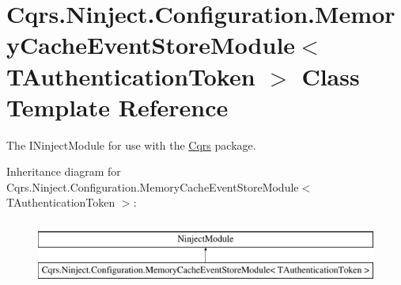 \hypertarget{classCqrs_1_1Ninject_1_1Configuration_1_1MemoryCacheEventStoreModule}{}\section{Cqrs.\+Ninject.\+Configuration.\+Memory\+Cache\+Event\+Store\+Module$<$ T\+Authentication\+Token $>$ Class Template Reference}
\label{classCqrs_1_1Ninject_1_1Configuration_1_1MemoryCacheEventStoreModule}


The I\+Ninject\+Module for use with the \hyperlink{namespaceCqrs}{Cqrs} package.  


Inheritance diagram for Cqrs.\+Ninject.\+Configuration.\+Memory\+Cache\+Event\+Store\+Module$<$ T\+Authentication\+Token $>$\+:\begin{figure}[H]
\begin{center}
\leavevmode
\includegraphics[height=2.000000cm]{classCqrs_1_1Ninject_1_1Configuration_1_1MemoryCacheEventStoreModule}
\end{center}
\end{figure}
